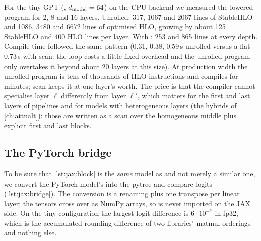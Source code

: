 \begin{napkinmath}
For the tiny GPT (, $d_{\text{model}}=64$) on the CPU backend we measured the
lowered program for 2, 8 and 16 layers. Unrolled: 317, 1067 and 2067 lines of StableHLO and
1086, 3480 and 6672 lines of optimised HLO, growing by about 125 StableHLO and 400 HLO lines
per layer. With : 253 and 865 lines at every depth. Compile time followed the same
pattern (0.31, 0.38, 0.59\,s unrolled versus a flat 0.73\,s with scan: the loop costs a
little fixed overhead and the unrolled program only overtakes it beyond about 20 layers at
this size). At production width the unrolled program is tens of thousands of HLO
instructions and compiles for minutes; scan keeps it at one layer's worth. The price is that
the compiler cannot specialise layer $\ell$ differently from layer $\ell'$, which matters
for the first and last layers of pipelines and for models with heterogeneous layers
(the hybrids of \cref{ch:attnalt}): those are written as a scan over the homogeneous
middle plus explicit first and last blocks.
\end{napkinmath}

\subsection{The PyTorch bridge}\label{sec:jax:bridge}
To be sure that \cref{lst:jax:block} is the \emph{same} model as  and
not merely a similar one, we convert the PyTorch model's  into the pytree
and compare logits (\cref{lst:jax:bridge}). The conversion is a renaming plus one transpose
per linear layer; the tensors cross over as NumPy arrays, so  is never imported
on the JAX side. On the tiny configuration the largest logit difference is
$6\cdot10^{-7}$ in fp32, which is the accumulated rounding difference of two libraries'
matmul orderings and nothing else.

